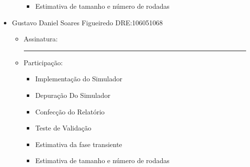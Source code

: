 \documentclass[a4paper,10pt]{article}
\begin{document}
\begin{itemize}
\begin{itemize}
\begin{itemize}
	\item Estimativa de tamanho e número de rodadas
    \end{itemize}
 \end{itemize} 
 \item Gustavo Daniel Soares Figueiredo DRE:106051068 
  \begin{itemize}
    \item Assinatura: \rule{6cm}{.1mm}	
    \item Participação:
    \begin{itemize}
	\item Implementação do Simulador
	\item Depuração Do Simulador
	\item Confecção do Relatório
	\item Teste de Validação
	\item Estimativa da fase transiente
	\item Estimativa de tamanho e número de rodadas
    \end{itemize}
 \end{itemize} 
\end{itemize}
\end{document}
